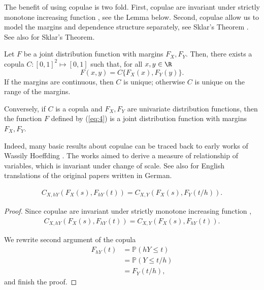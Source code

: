 The benefit of using copulae is two fold.
First, copulae are invariant under strictly
monotone increasing function \citep{schweizer1981nonparametric}, see the Lemma below.
Second, copulae allow us to model the  margins and dependence structure separately, see Sklar's Theorem
\citep{Sklar1959}.
See also \citep{Nelsen1999, joe1997multivariate, McNeil2005} for Sklar's Theorem.

\begin{theorem}
  Let $F$ be a joint distribution function with margins $F_X,
  F_Y$. Then, there exists a copula $C:[0,1]^2 \mapsto [0,1]$ such
  that, for all $x,y\in \R$
  \begin{equation}
    \label{eq:4}
    F(x,y)=C\{F_X(x), F_Y(y)\}.
  \end{equation}
  If the margins are continuous, then $C$ is unique; otherwise $C$ is
  unique on the range of the margins.

  Conversely, if $C$ is a copula and $F_X, F_Y$ are univariate
  distribution functions, then the function $F$ defined by (\ref{eq:4})
  is a joint distribution function with margins $F_X, F_Y$.
\end{theorem}

Indeed, many basic results about copulae can be traced back to early
works of Wassily Hoeffding \citep{hoedffding1940, hoedffding1941}. 
The works aimed to derive a measure of relationship of variables,
which is invariant under change of scale. 
See also \citet{hoeffding2012collected} for English translations of
the original papers written in German. 

\begin{lemma}
  \begin{align}
  C_{X, hY}\left(F_X(s),F_{hY}(t)\right) = C_{X, Y}\left(F_X(s),F_{Y}(t/h)\right).
    \end{align}
  \end{lemma}

\begin{proof}
  Since copulae are invariant under strictly monotone increasing function \cite[Theorem 3 (i)]{schweizer1981nonparametric},
  \begin{align*}
    C_{X, hY}\left(F_X(s),F_{hY}(t)\right) = C_{X, Y}\left(F_X(s),F_{hY}(t)\right).
    \end{align*}

  We rewrite second argument of the copula
  \begin{align*}
    F_{hY}(t) &= \mathbb{P}(hY \leq t)\\
              &= \mathbb{P}(Y \leq t/h)\\
              &= F_Y(t/h),
    \end{align*}
  and finish the proof.
  \end{proof}

